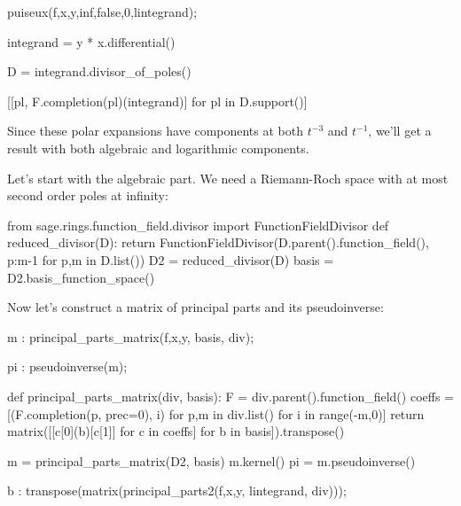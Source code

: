 \begin{maximablock}
puiseux(f,x,y,inf,false,0,lintegrand);
\end{maximablock}

\begin{sageblock}[ex8.7]
integrand = y * x.differential()

D = integrand.divisor_of_poles()

[[pl, F.completion(pl)(integrand)] for pl in D.support()]
\end{sageblock}

Since these polar expansions have components at both $t^{-3}$ and
$t^{-1}$, we'll get a result with both algebraic and logarithmic
components.

Let's start with the algebraic part.  We need a Riemann-Roch
space with at most second order poles at infinity:


\begin{sageblock}[ex8.7]
from sage.rings.function_field.divisor import FunctionFieldDivisor
def reduced_divisor(D):
    return FunctionFieldDivisor(D.parent().function_field(),
                                {p:m-1 for p,m in D.list()})
D2 = reduced_divisor(D)
basis = D2.basis_function_space()
\end{sageblock}

Now let's construct a matrix of principal parts
and its pseudoinverse:

\begin{maximablock}
m : principal_parts_matrix(f,x,y, basis, div);

pi : pseudoinverse(m);
\end{maximablock}

\begin{sageblock}[ex8.7]
def principal_parts_matrix(div, basis):
    F = div.parent().function_field()
    coeffs = [(F.completion(p, prec=0), i) for p,m in div.list() for i in range(-m,0)]
    return matrix([[c[0](b)[c[1]] for c in coeffs] for b in basis]).transpose()
\end{sageblock}

\begin{sageblock}[ex8.7]
m = principal_parts_matrix(D2, basis)
m.kernel()
pi = m.pseudoinverse()
\end{sageblock}

\begin{maximablock}
b : transpose(matrix(principal_parts2(f,x,y, lintegrand, div)));
\end{maximablock}

